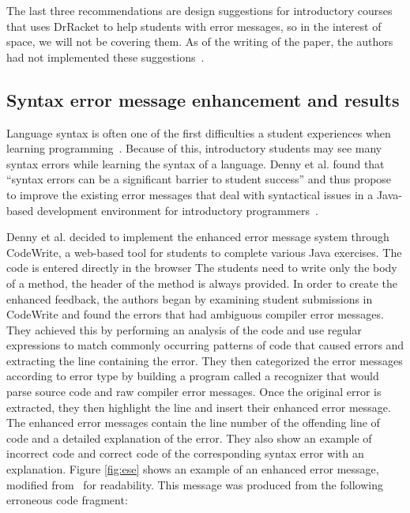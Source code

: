 \documentclass{sig-alternate}
\begin{document}
The last three recommendations are design suggestions for introductory courses that uses DrRacket to help students with error messages, so in the interest of space, we will not be covering them.
As of the writing of the paper, the authors had not implemented these suggestions~\cite{Marceau:2011:MYL:2048237.2048241}. 



\subsection{Syntax error message enhancement and results}\label{subsec:syntax enhancement}

Language syntax is often one of the first difficulties a student experiences when learning programming~\cite{Denny:2011:USB:1999747.1999807}.
Because of this, introductory students may see many syntax errors while learning the syntax of a language.
Denny et al. found that ``syntax errors can be a significant barrier to student success'' and thus propose to improve the existing error messages that deal with syntactical issues in a Java-based development environment for introductory programmers~\cite{Denny:2014:ESE:2591708.2591748}.

Denny et al. decided to implement the enhanced error message system through CodeWrite, a web-based tool for students to complete various Java exercises.
The code is entered directly in the browser
The students need to write only the body of a method, the header of the method is always provided.
In order to create the enhanced feedback, the authors began by examining student submissions in CodeWrite and found the errors that had ambiguous compiler error messages. 
They achieved this by performing an analysis of the code and use regular expressions to match commonly occurring patterns of code that caused errors and  extracting the line containing the error.
They then categorized the error messages according to error type by building a program called a recognizer that would parse source code and raw compiler error messages.
Once the original error is extracted, they then highlight the line and insert their enhanced error message.
The enhanced error messages contain the line number of the offending line of code and a detailed explanation of the error.
They also show an example of incorrect code and correct code of the corresponding syntax error with an explanation.
Figure \ref{fig:ese} shows an example of an enhanced error message, modified from~\cite{Denny:2014:ESE:2591708.2591748} for readability.
This message was produced from the following erroneous code fragment:
\end{document}
